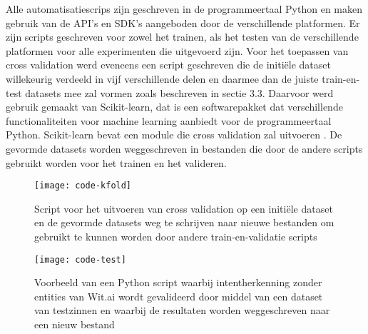 Alle automatisatiescrips zijn geschreven in de programmeertaal Python en maken gebruik van de API’s en SDK's aangeboden door de verschillende platformen. Er zijn scripts geschreven voor zowel het trainen, als het testen van de verschillende platformen voor alle experimenten die uitgevoerd zijn. Voor het toepassen van cross validation werd eveneens een script geschreven die de initiële dataset willekeurig verdeeld in vijf verschillende delen en daarmee dan de juiste train-en-test datasets mee zal vormen zoals beschreven in sectie 3.3. Daarvoor werd gebruik gemaakt van Scikit-learn, dat is een softwarepakket dat verschillende functionaliteiten voor machine learning aanbiedt voor de programmeertaal Python. Scikit-learn bevat een module die cross validation zal uitvoeren \autocite{sklearn2020}. De gevormde datasets worden weggeschreven in bestanden die door de andere scripts gebruikt worden voor het trainen en het valideren.

\begin{figure}[H]
    \label{fig:code-kfold}
    \centering
    \texttt{[image: code-kfold]}
    \caption{Script voor het uitvoeren van cross validation op een initiële dataset en de gevormde datasets weg te schrijven naar nieuwe bestanden om gebruikt te kunnen worden door andere train-en-validatie scripts}
\end{figure}

\begin{figure}[H]
    \label{fig:code-validatie}
    \centering
    \texttt{[image: code-test]}
    \caption{Voorbeeld van een Python script waarbij intentherkenning zonder entities van Wit.ai wordt gevalideerd door middel van een dataset van testzinnen en waarbij de resultaten worden weggeschreven naar een nieuw bestand}
\end{figure}

























